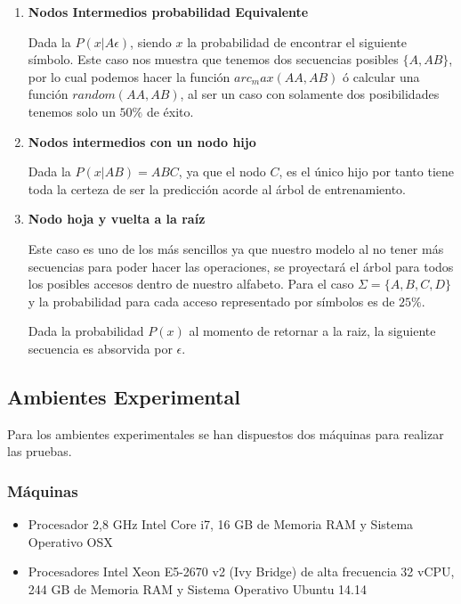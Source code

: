 \begin{enumerate}
	\item \textbf{Nodos Intermedios probabilidad Equivalente}
	
	Dada la $P( x | A\epsilon  )$, siendo $x$ la probabilidad de encontrar el siguiente símbolo. Este caso nos muestra que tenemos dos secuencias posibles $\{A,AB\}$, por lo cual podemos hacer la función $arc_max(AA,AB)$ ó calcular una función $random(AA,AB)$, al ser un caso con solamente dos posibilidades tenemos solo un $50\%$ de éxito.
	
	
	\item \textbf{Nodos intermedios con un nodo hijo }
	
	Dada la $P( x | AB  )  = ABC$, ya que  el nodo $C$, es el único hijo por tanto tiene toda la certeza de ser la predicción acorde al árbol de entrenamiento.
		
		
		
	\item \textbf{Nodo hoja y vuelta a la raíz}	
	
	Este caso es uno de los más sencillos ya que nuestro modelo al no tener más secuencias para poder hacer las operaciones, se proyectará el árbol para todos los posibles accesos dentro de nuestro alfabeto. Para el caso $\Sigma = \{A,B,C,D \} $ y la probabilidad para cada acceso representado por símbolos es de $25\%$.
	
	
	Dada la probabilidad $P( x ) $ al momento de retornar a la raiz, la siguiente secuencia es absorvida por $\epsilon$.
	

\end{enumerate}



\subsection{Ambientes Experimental}

Para los ambientes experimentales se han dispuestos dos máquinas para realizar las pruebas. 

\subsubsection{Máquinas}
	\begin{itemize}
		\item Procesador 2,8 GHz Intel Core i7, 16 GB de Memoria RAM y Sistema Operativo OSX
		\item Procesadores Intel Xeon E5-2670 v2 (Ivy Bridge) de alta frecuencia 32 vCPU, 244 GB de Memoria RAM y Sistema Operativo Ubuntu 14.14 
	\end{itemize}
	
